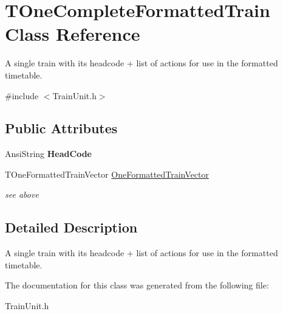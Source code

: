 \hypertarget{class_t_one_complete_formatted_train}{}\section{T\+One\+Complete\+Formatted\+Train Class Reference}
\label{class_t_one_complete_formatted_train}


A single train with its headcode + list of actions for use in the formatted timetable.  




{\ttfamily \#include $<$Train\+Unit.\+h$>$}

\subsection*{Public Attributes}
\begin{DoxyCompactItemize}
\item 
\mbox{\label{class_t_one_complete_formatted_train_a64e2c06ac8ceb57b8f2cf4fe316fdd09}} 
Ansi\+String {\bfseries Head\+Code}
\item 
\mbox{\label{class_t_one_complete_formatted_train_a7153d13265831ee7c241779b5c803278}} 
T\+One\+Formatted\+Train\+Vector \mbox{\hyperlink{class_t_one_complete_formatted_train_a7153d13265831ee7c241779b5c803278}{One\+Formatted\+Train\+Vector}}
\begin{DoxyCompactList}\small\item\em see above \end{DoxyCompactList}\end{DoxyCompactItemize}


\subsection{Detailed Description}
A single train with its headcode + list of actions for use in the formatted timetable. 

The documentation for this class was generated from the following file\+:\begin{DoxyCompactItemize}
\item 
Train\+Unit.\+h\end{DoxyCompactItemize}
